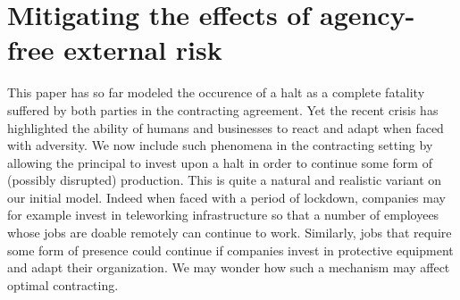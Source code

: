 \documentclass[numbook, envcountsect, envcountsame, envcountreset, runningheads, smallextended]{article}
\newtheorem{Remark}{Remark}[part]
\def \E{\mathbb{E}}
\begin{document}

\section{Mitigating the effects of agency-free external risk}
\label{sec:M}

This paper has so far modeled the occurence of a halt as a complete fatality suffered by both parties in the contracting agreement. Yet the recent crisis has highlighted the ability of humans and businesses to react and adapt when faced with adversity. We now include such phenomena in the contracting setting by allowing the principal to invest upon a halt in order to continue some form of (possibly disrupted) production. This is quite a natural and realistic variant on our initial model. Indeed when faced with a period of lockdown, companies may for example invest in teleworking infrastructure so that a number of employees whose jobs are doable remotely can continue to work. Similarly, jobs that require some form of presence could continue if companies invest in protective equipment and adapt their organization. We may wonder how such a mechanism may affect optimal contracting. 
\end{document}
